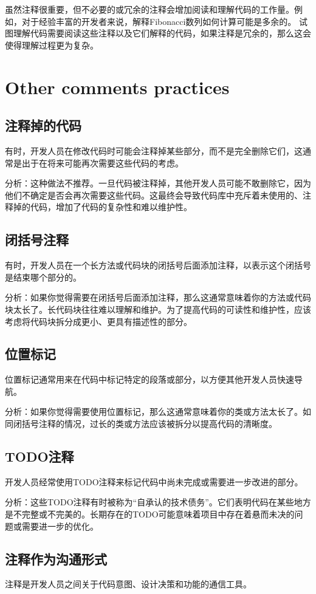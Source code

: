 \documentclass[]{ctexbook}
\begin{document}
虽然注释很重要，但不必要的或冗余的注释会增加阅读和理解代码的工作量。例如，对于经验丰富的开发者来说，解释Fibonacci数列如何计算可能是多余的。
试图理解代码需要阅读这些注释以及它们解释的代码，如果注释是冗余的，那么这会使得理解过程更为复杂。

\section{Other comments practices}
\subsection{注释掉的代码}
有时，开发人员在修改代码时可能会注释掉某些部分，而不是完全删除它们，这通常是出于在将来可能再次需要这些代码的考虑。

分析：这种做法不推荐。一旦代码被注释掉，其他开发人员可能不敢删除它，因为他们不确定是否会再次需要这些代码。这最终会导致代码库中充斥着未使用的、注释掉的代码，增加了代码的复杂性和难以维护性。

\subsection{闭括号注释}
有时，开发人员在一个长方法或代码块的闭括号后面添加注释，以表示这个闭括号是结束哪个部分的。

分析：如果你觉得需要在闭括号后面添加注释，那么这通常意味着你的方法或代码块太长了。长代码块往往难以理解和维护。为了提高代码的可读性和维护性，应该考虑将代码块拆分成更小、更具有描述性的部分。
\subsection{位置标记}
位置标记通常用来在代码中标记特定的段落或部分，以方便其他开发人员快速导航。

分析：如果你觉得需要使用位置标记，那么这通常意味着你的类或方法太长了。如同闭括号注释的情况，过长的类或方法应该被拆分以提高代码的清晰度。
\subsection{TODO注释}
开发人员经常使用TODO注释来标记代码中尚未完成或需要进一步改进的部分。

分析：这些TODO注释有时被称为“自承认的技术债务”。它们表明代码在某些地方是不完整或不完美的。长期存在的TODO可能意味着项目中存在着悬而未决的问题或需要进一步的优化。
\subsection{注释作为沟通形式}
注释是开发人员之间关于代码意图、设计决策和功能的通信工具。
\end{document}
